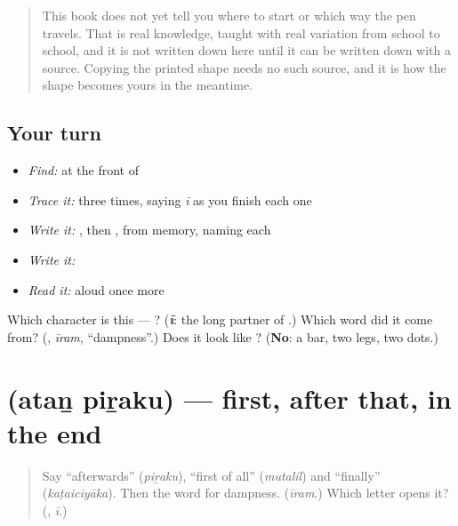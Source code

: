 \begin{quote}
This book does not yet tell you where to start  or which way the pen travels. That is real knowledge, taught with real variation from school to school, and it is not written down here until it can be written down with a source. Copying the printed shape needs no such source, and it is how the shape becomes yours in the meantime.
\end{quote}

\subsection*{Your turn}
\begin{itemize}
\raggedright
  \item \emph{Find:}  at the front of \textbf{}
  \item \emph{Trace it:}  three times, saying \emph{ī} as you finish each one
  \item \emph{Write it:} , then , from memory, naming each
  \item \emph{Write it:} \textbf{}
  \item \emph{Read it:} \textbf{} aloud once more
\end{itemize}

\begin{tcolorbox}[breakable,colback=teal!4,colframe=teal!35!black,title={Before you move on}]
Which character is this — ? (\emph{\textbf{ī}}: the long partner of \textbf{}.) Which word did it come from? (\textbf{}, \emph{īram}, \textquotedblleft{}dampness\textquotedblright{}.) Does it look like \textbf{}? (\textbf{No}: a bar, two legs, two dots.)
\end{tcolorbox}
\section[\texorpdfstring{\ta{அதன்} \ta{பிறகு} (ataṉ piṟaku)}{அதன் பிறகு (ataṉ piṟaku)}]{  (ataṉ piṟaku) — first, after that, in the end}

\label{lesson:TA-C285-atan-piraku}



\begin{quote}
Say \textquotedblleft{}afterwards\textquotedblright{} (\emph{piṟaku}), \textquotedblleft{}first of all\textquotedblright{} (\emph{mutalil}) and \textquotedblleft{}finally\textquotedblright{} (\emph{kaṭaiciyāka}). Then the word for dampness. (\emph{īram}.) Which letter opens it? (\textbf{}, \emph{ī}.)
\end{quote}

